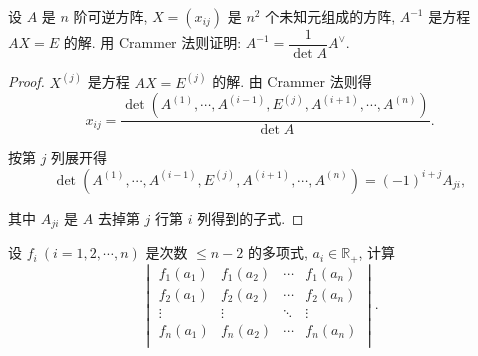 \documentclass[color=black,device=normal,lang=cn,mode=geye]{elegantnote}
\begin{document}
\begin{exercisec}[4.3.9]
    设 $A$ 是 $n$ 阶可逆方阵, $X=(x_{ij})$ 是 $n^2$ 个未知元组成的方阵, $A^{-1}$ 是方程 $AX=E$ 的解. 用 Crammer 法则证明: $A^{-1}=\dfrac{1}{\det A}A^\vee$.
\end{exercisec}
\begin{proof}
    $X^{(j)}$ 是方程 $AX=E^{(j)}$ 的解. 由 Crammer 法则得
    \[x_{ij}=\dfrac{\det(A^{(1)},\cdots,A^{(i-1)},E^{(j)},A^{(i+1)},\cdots,A^{(n)})}{\det A}.\]

    按第 $j$ 列展开得
    \[\det(A^{(1)},\cdots,A^{(i-1)},E^{(j)},A^{(i+1)},\cdots,A^{(n)})=(-1)^{i+j}A_{ji},\]

    其中 $A_{ji}$ 是 $A$ 去掉第 $j$ 行第 $i$ 列得到的子式.
\end{proof}
\begin{exercisec}
    设 $f_i\ (i=1,2,\cdots,n)$ 是次数 $\leq n-2$ 的多项式, $a_i\in\mathbb{R}_+$, 计算
    \[\begin{vmatrix}
        f_1(a_1) & f_1(a_2) & \cdots & f_1(a_n) \\
        f_2(a_1) & f_2(a_2) & \cdots & f_2(a_n) \\
        \vdots & \vdots & \ddots & \vdots \\
        f_n(a_1) & f_n(a_2) & \cdots & f_n(a_n) \\
    \end{vmatrix}.\]
\end{exercisec}
\end{document}
